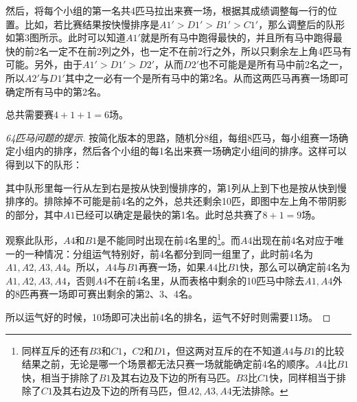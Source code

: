 \begin{example}[赛马简化版]
  然后，将每个小组的第一名共4匹马拉出来赛一场，根据其成绩调整每一行的位置。比如，若比赛结果按快慢排序是$A1'>D1'>B1'>C1'$，那么调整后的队形如第3图所示。此时可以知道$A1'$就是所有马中跑得最快的，并且所有马中跑得最快的前2名一定不在前2列之外，也一定不在前2行之外，所以只剩余左上角4匹马有可能。另外，由于$A1'>D1'>D2'$，从而$D2'$也不可能是是所有马中前2名之一，所以$A2'$与$D1'$其中之一必有一个是所有马中的第2名。从而这两匹马再赛一场即可确定所有马中的第2名。

  总共需要赛$4+1+1=6$场。
\end{example}

\begin{proof}[64匹马问题的提示]
  按简化版本的思路，随机分8组，每组8匹马，每小组赛一场确定小组内的排序，然后各个小组的每1名出来赛一场确定小组间的排序。这样可以得到以下的队形：
  \begin{center}
  \end{center}
  其中队形里每一行从左到右是按从快到慢排序的，第1列从上到下也是按从快到慢排序的。排除掉不可能是前4名的之外，总共还剩余10匹，即图中左上角不带阴影的部分，其中$A1$已经可以确定是最快的第1名。此时总共赛了$8+1=9$场。

  观察此队形，$A4$和$B1$是不能同时出现在前4名里的\footnote{同样互斥的还有$B3$和$C1$，$C2$和$D1$，但这两对互斥的在不知道$A4$与$B1$的比较结果之前，无论是哪一个场景都无法只赛一场就能确定前4名的顺序。$A4$比$B1$快，相当于排除了$B1$及其右边及下边的所有马匹。$B3$比$C1$快，同样相当于排除了$C1$及其右边及下边的所有马匹，但$A2,A3,A4$无法排除。}。而$A4$出现在前4名对应于唯一的一种情况：分组运气特别好，前4名都分到同一组里了，此时前4名为$A1,A2,A3,A4$。所以，$A4$与$B1$再赛一场，如果$A4$比$B1$快，那么可以确定前4名为$A1,A2,A3,A4$，否则$A4$不在前4名里，从而表格中剩余的10匹马中除去$A1,A4$外的8匹再赛一场即可赛出剩余的第2、3、4名。

  所以运气好的时候，10场即可决出前4名的排名，运气不好时则需要11场。
\end{proof}